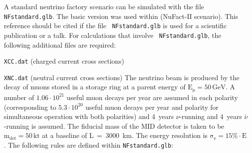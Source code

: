 A standard neutrino factory scenario can be simulated with the file {\tt NFstandard.glb}. The basic version was
used within \cite{Huber:2002mx} (NuFact-II scenario). This reference should be cited if the file {\tt
NFstandard.glb} is used for a scientific publication or a talk. For calculations that involve {\tt
NFstandard.glb}, the following additional files are required:
\bi
\item {\tt XCC.dat} (charged current cross sections)
\item {\tt XNC.dat} (neutral current cross sections)
\ei
The neutrino beam is produced by the decay of muons stored in a storage ring at a parent energy of
$\mathrm{E_\mu = 50\,GeV}$. A number of $1.06\cdot10^{21}$ useful muon decays per year are assumed in each
polarity (corresponding to $5.3\cdot10^{20}$ useful muon decays per year and polarity for simultaneous operation
with both polarities) and 4~years $\nu$-running and 4~years $\bar{\nu}$-running is
assumed. The fiducial mass of the MID detector is taken to be $\mathrm{m_{det} = 50 \,kt}$ at a baseline of
L~=~3000~km. The energy resolution is $\mathrm{\sigma_e=15\%\cdot E}$. The following rules are defined within
{\tt NFstandard.glb}:
